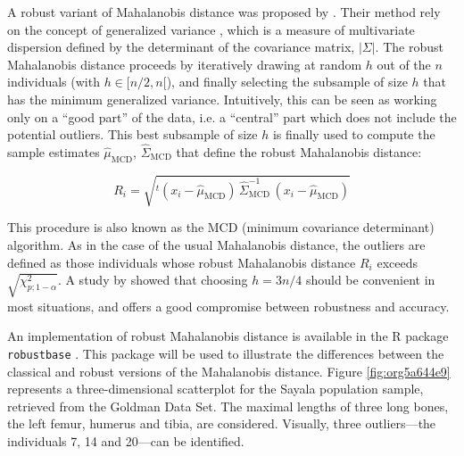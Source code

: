 \documentclass[review, 3p]{elsarticle}
\begin{document}
A robust variant of Mahalanobis distance was proposed by \cite{hubert2018_MinimumCovarianceDeterminant}. Their method rely on the concept of generalized variance \citep{oja1983_DescriptiveStatisticsMultivariate,wilks1960_MultidimensionalStatisticalScatter,sengupta2006_GeneralizedVariance}, which is a measure of multivariate dispersion defined by the determinant of the covariance matrix, \(|\Sigma|\). The robust Mahalanobis distance proceeds by iteratively drawing at random \(h\) out of the \(n\) individuals (with \(h \in [n/2, n[\)), and finally selecting the subsample of size \(h\) that has the minimum generalized variance. Intuitively, this can be seen as working only on a ``good part'' of the data, i.e. a ``central'' part which does not include the potential outliers. This best subsample of size \(h\) is finally used to compute the sample estimates \(\hat{\mu}_{\text{MCD}}\), \(\hat{\Sigma}_{\text{MCD}}\) that define the robust Mahalanobis distance:

\begin{equation}
R_i = \sqrt{{}^t(x_i - \hat{\mu}_\text{MCD}) \, \hat{\Sigma}_\text{MCD}^{-1} \, (x_i - \hat{\mu}_\text{MCD})} \label{eq:robust_maha}
\end{equation}

This procedure is also known as the MCD (minimum covariance determinant) algorithm. As in the case of the usual Mahalanobis distance, the outliers are defined as those individuals whose robust Mahalanobis distance \(R_i\) exceeds \(\sqrt{\chi^2_{p; 1-\alpha}}\). A study by \cite{leys2018_DetectingMultivariateOutliers} showed that choosing \(h = 3n/4\) should be convenient in most situations, and offers a good compromise between robustness and accuracy.

An implementation of robust Mahalanobis distance is available in the R package \texttt{robustbase} \citep{todorov2009_ObjectOrientedFrameworkRobust}. This package will be used to illustrate the differences between the classical and robust versions of the Mahalanobis distance. Figure \ref{fig:org5a644e9} represents a three-dimensional scatterplot for the Sayala population sample, retrieved from the Goldman Data Set. The maximal lengths of three long bones, the left femur, humerus and tibia, are considered. Visually, three outliers---the individuals 7, 14 and 20---can be identified.
\end{document}
